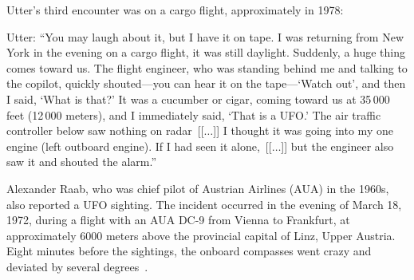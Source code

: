


Utter's third encounter was on a cargo flight, approximately in 1978:
\begin{svgraybox}
Utter: ``You may laugh about it, but I have it on tape.
I was returning from New York in the evening on a cargo flight,
it was still daylight. Suddenly, a huge thing comes toward us.
The flight engineer, who was standing behind me and talking to the copilot,
quickly shouted---you can hear it on the tape---`Watch out', and then I said, `What is that?'
It was a cucumber or cigar, coming toward us at 35\,000 feet (12\,000 meters),
and I immediately said, `That is a UFO.'
The air traffic controller below saw nothing on radar~[[$\ldots$]]
 I thought it was going into my one engine (left outboard engine).
If I had seen it alone,~[[$\ldots$]] but the engineer also saw it and shouted the alarm.''
\end{svgraybox}




Alexander Raab, who was chief pilot of Austrian Airlines (AUA) in the 1960s, also reported a UFO sighting.
The incident occurred in the evening of March 18, 1972, during a flight with an AUA DC-9 from Vienna to Frankfurt,
at approximately 6000 meters above the provincial capital of Linz, Upper Austria.
Eight minutes before the sightings, the onboard compasses went crazy and deviated by several degrees~\cite{Raab-Kletter-Linz}.

